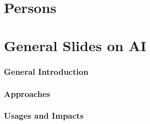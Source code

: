 \begin{bibliographysection}

\part{Persons}

\localized
\localized
\localized
\localized
\localized

\part{General Slides on AI}

\section{General Introduction}
\localized
\localized
\localized
\localized

\section{Approaches}
\localized
\localized
\localized
\localized
\localized

\section{Usages and Impacts}
\localized
\localized
\localized
\localized
\localized
\localized
\localized


\end{bibliographysection}
